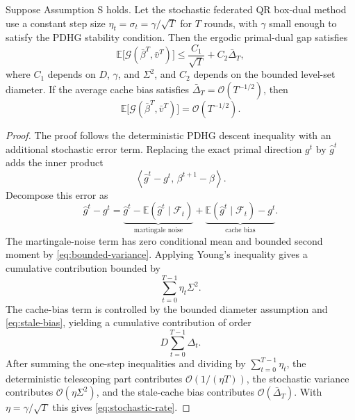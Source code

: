 \begin{theorem}
\label{thm:stochastic-rate}
Suppose Assumption S holds. Let the stochastic federated QR box-dual method use
a constant step size $\eta_t=\sigma_t=\gamma/\sqrt{T}$ for $T$ rounds, with
$\gamma$ small enough to satisfy the PDHG stability condition. Then the
ergodic primal-dual gap satisfies
\begin{equation}
    \mathbb{E}\big[
    \mathcal{G}(\bar{\beta}^T,\bar{v}^T)
    \big]
    \le
    \frac{C_1}{\sqrt{T}}
    +
    C_2 \bar{\Delta}_T,
    \label{eq:stochastic-rate}
\end{equation}
where $C_1$ depends on $D$, $\gamma$, and $\Sigma^2$, and $C_2$ depends on the
bounded level-set diameter. If the average cache bias satisfies
$\bar{\Delta}_T=\mathcal{O}(T^{-1/2})$, then
\begin{equation}
    \mathbb{E}\big[
    \mathcal{G}(\bar{\beta}^T,\bar{v}^T)
    \big]
    =
    \mathcal{O}(T^{-1/2}).
\end{equation}
\end{theorem}

\begin{proof}
The proof follows the deterministic PDHG descent inequality with an additional
stochastic error term. Replacing the exact primal direction $g^t$ by
$\widehat{g}^t$ adds the inner product
\[
    \left\langle
    \widehat{g}^t-g^t,\,
    \beta^{t+1}-\beta
    \right\rangle .
\]
Decompose this error as
\[
    \widehat{g}^t-g^t
    =
    \underbrace{
    \widehat{g}^t-\mathbb{E}(\widehat{g}^t\mid\mathcal{F}_t)
    }_{\text{martingale noise}}
    +
    \underbrace{
    \mathbb{E}(\widehat{g}^t\mid\mathcal{F}_t)-g^t
    }_{\text{cache bias}} .
\]
The martingale-noise term has zero conditional mean and bounded second moment
by \eqref{eq:bounded-variance}. Applying Young's inequality gives a cumulative
contribution bounded by
\[
    \sum_{t=0}^{T-1} \eta_t \Sigma^2 .
\]
The cache-bias term is controlled by the bounded diameter assumption and
\eqref{eq:stale-bias}, yielding a cumulative contribution of order
\[
    D\sum_{t=0}^{T-1}\Delta_t .
\]
After summing the one-step inequalities and dividing by
$\sum_{t=0}^{T-1}\eta_t$, the deterministic telescoping part contributes
$\mathcal{O}(1/(\eta T))$, the stochastic variance contributes
$\mathcal{O}(\eta\Sigma^2)$, and the stale-cache bias contributes
$\mathcal{O}(\bar{\Delta}_T)$. With $\eta=\gamma/\sqrt{T}$ this gives
\eqref{eq:stochastic-rate}.
\end{proof}

